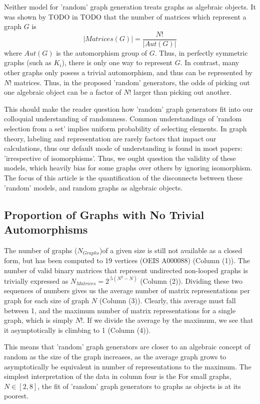 \documentclass[a4paper,12pt]{article}
\begin{document}
Neither model for 'random' graph generation treats graphs as algebraic objects.
It was shown by TODO in TODO that the number of matrices which represent a graph \(G\) is
\[| Matrices(G) | = \frac{N!}{| Aut(G) |}\]
where \(Aut(G)\) is the automorphism group of \(G\).
Thus, in perfectly symmetric graphs (such as \(K_i\)), there is only one way to represent \(G\).
In contrast, many other graphs only posess a trivial automorphism, and thus can be represented by \(N!\) matrices.
Thus, in the proposed 'random' generators, the odds of picking out one algebraic object can be a factor of \(N!\) larger than picking out another. 

This should make the reader question how 'random' graph generators fit into our colloquial understanding of randomness.
Common understandings of 'random selection from a set' implies uniform probability of selecting elements.
In graph theory, labeling and representation are rarely factors that impact our calculations, thus our default mode of understanding is found in most papers: 'irrespective of isomorphisms'.
Thus, we ought question the validity of these models, which heavily bias for some graphs over others by ignoring isomorphism.
The focus of this article is the quantification of the disconnects between these 'random' models, and random graphs as algebraic objects.

\subsection*{Proportion of Graphs with No Trivial Automorphisms}

The number of graphs (\(N_{Graphs}\))of a given size is still not available as a closed form, but has been computed to 19 vertices (OEIS A000088) (Column (1)).
The number of valid binary matrices that represent undirected non-looped graphs is trivially expressed as \(N_{Matrices} = 2^{.5(N^2 - N)}\) (Column (2)).
Dividing these two sequences of numbers gives us the average number of matrix representations per graph for each size of graph \(N\) (Column (3)).
Clearly, this average must fall between 1, and the maximum number of matrix representations for a single graph, which is simply \(N!\).
If we divide the average by the maximum, we see that it asymptotically is climbing to 1 (Column (4)).

This means that 'random' graph generators are closer to an algebraic concept of random as the size of the graph increases, 
as the average graph grows to asymptotically be equivalent in number of representations to the maximum.
The simplest interpretation of the data in column four is the 
For small graphs, \(N \in [2, 8]\), the fit of 'random' graph generators to graphs as objects is at its poorest.
\end{document}
